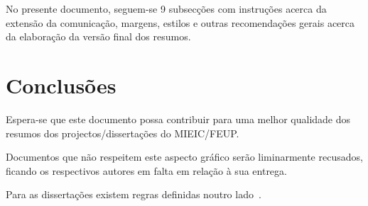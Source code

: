 \documentclass[9pt,a4paper]{extarticle}
\begin{document}
\begin{multicols}{2}
No presente documento, seguem-se 9 subsecções com instruções acerca da extensão da comunicação, margens, estilos e outras recomendações gerais acerca da elaboração da versão final dos resumos.

\section{Conclusões}\label{sec:conclui}

Espera-se que este documento possa contribuir para uma melhor qualidade dos resumos dos projectos/dissertações do MIEIC/FEUP.

Documentos que não respeitem este aspecto gráfico serão liminarmente recusados, ficando os respectivos autores em falta em relação à sua entrega.

Para as dissertações existem regras definidas noutro lado~\cite{kn:Mat93}.



\end{multicols}
\end{document}
